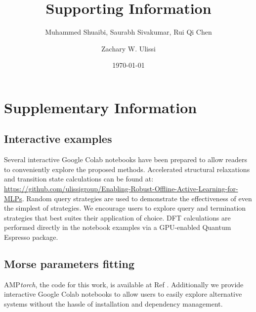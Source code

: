 \documentclass[%
 reprint,
 amsmath,amssymb,
 aps,
]{revtex4-2}
\begin{document}
\title{Supporting Information}

\author{Muhammed Shuaibi, Saurabh Sivakumar, Rui Qi Chen}
\author{Zachary W. Ulissi}%
%

\date{\today}
            
             
\section{Supplementary Information}
\renewcommand{\theequation}{S.\arabic{equation}}
\renewcommand\thefigure{S.\arabic{figure}}
\setcounter{figure}{0}  
\setcounter{equation}{0}  
\subsection{Interactive examples}
Several interactive Google Colab notebooks have been prepared to allow readers to conveniently explore the proposed methods. Accelerated structural relaxations and transition state calculations can be found at: \url{https://github.com/ulissigroup/Enabling-Robust-Offline-Active-Learning-for-MLPs}. Random query strategies are used to demonstrate the effectiveness of even the simplest of strategies. We encourage users to explore query and termination strategies that best suites their application of choice. DFT calculations are performed directly in the notebook examples via a GPU-enabled Quantum Espresso package.

\subsection{Morse parameters fitting}
AMP\textit{torch}, the code for this work, is available at Ref \cite{amptorch}. Additionally we provide interactive Google Colab \cite{examples} notebooks to allow users to easily explore alternative systems without the hassle of installation and dependency management. 
\end{document}
